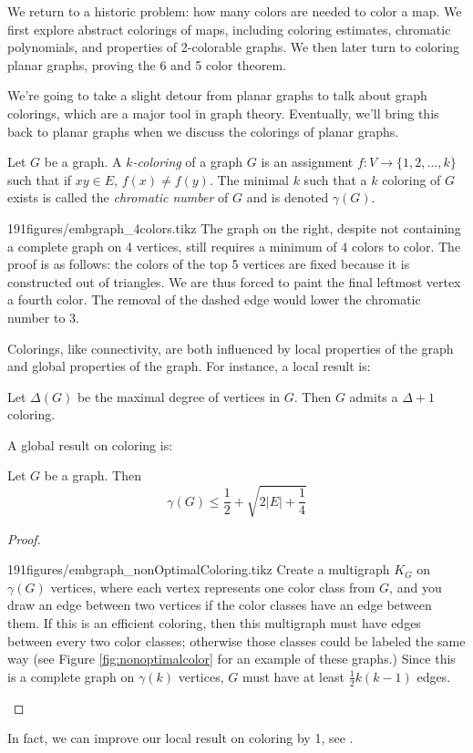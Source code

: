 

\begin{elevator}
We return to a historic problem: how many colors are needed to color a map. We first explore abstract colorings of maps, including coloring estimates, chromatic polynomials, and properties of 2-colorable graphs. We then later turn to coloring planar graphs, proving the 6 and 5 color theorem. 
\end{elevator}
\label{sec:planar:coloring}
We're going to take a slight detour from planar graphs to talk about graph colorings, which are a major tool in graph theory. Eventually, we'll bring this back to planar graphs when we discuss the colorings of planar graphs. 
\begin{definition}[Colorings]
 Let $G$ be a graph. A \emph{$k$-coloring} of a graph $G$ is an assignment  $f: V\to \{1,2, \ldots ,k\}$ such that if $xy\in E$, $f(x)\neq f(y)$. The minimal $k$ such that a $k$ coloring of $G$ exists is called the \emph{chromatic number} of $G$ and is denoted $\gamma(G)$. 
\end{definition}

\begin{examplefigureenv}{191figures/embgraph_4colors.tikz}
  The graph on the right, despite not containing a complete graph on 4 vertices, still requires a minimum of 4 colors to color. The proof is as follows: the colors of the top 5 vertices are fixed because it is constructed out of triangles. We are thus forced to paint the final leftmost vertex a fourth color. The removal of the dashed edge would lower the chromatic number to 3. 
\end{examplefigureenv}
Colorings, like connectivity, are both influenced by local properties of the graph and global properties of the graph. For instance, a local result is:
\begin{claim}
 Let $\Delta(G)$ be the maximal degree of vertices in $G$. Then $G$ admits a $\Delta+1$ coloring. 
\end{claim}
A global result on coloring is:
\begin{claim}
 Let $G$ be a graph. Then 
 \[\gamma(G)\leq \frac{1}{2}+\sqrt{2|E|+\frac{1}{4}}\]
\end{claim}
\begin{proof}
\begin{paragraphfigureenv}{191figures/embgraph_nonOptimalColoring.tikz}
 Create a multigraph $K_G$ on $\gamma(G)$ vertices, where each vertex represents one color class from $G$, and you draw an edge between two vertices if the color classes have an edge between them. If this is an efficient coloring, then this multigraph must have edges between every two color classes; otherwise those classes could be labeled the same way (see Figure \ref{fig:nonoptimalcolor} for an example of these graphs.) Since this is a complete graph on $\gamma(k)$ vertices, $G$ must have at least $\frac{1}{2}k(k-1)$ edges. 
\end{paragraphfigureenv}
\end{proof}
In fact, we can improve our local result on coloring by 1, see . 

